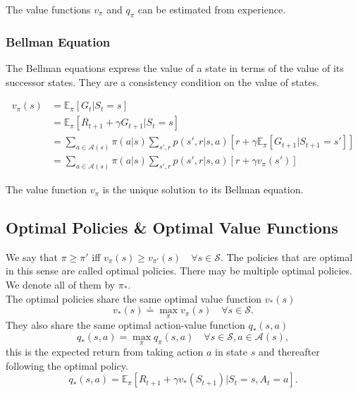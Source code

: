 \documentclass[a4paper, oneside, 11pt]{article}
\newcommand\Epi{\mathbb{E}_\pi}
\begin{document}
The value functions $v_\pi$ and $q_\pi$ can be estimated from experience.\\

\subsubsection*{Bellman Equation}

The Bellman equations express the value of a state in terms of the value of its successor states. They are a consistency condition on the value of states. 

\begin{align}
    v_{\pi}(s) &= \Epi{}[G_t | S_t = s] \\
             &= \Epi{}[R_{t+1} + \gamma G_{t+1} | S_t = s] \\
             &= \sum_{a \in \mathcal{A}(s)} \pi(a|s) \sum_{s', r} p(s', r | s, a) \left[r + \gamma \Epi{}[G_{t+1} | S_{t+1} = s']\right] \\
             &=  \sum_{a \in \mathcal{A}(s)} \pi(a|s) \sum_{s', r} p(s', r | s, a) [r + \gamma v_{\pi}(s')]
\end{align} 
    

The value function $v_\pi$ is the unique solution to its Bellman equation.


\subsection{Optimal Policies \& Optimal Value Functions}
We say that $\pi \geq \pi'$ iff $v_\pi (s) \geq v_{\pi'}(s) \quad \forall s \in \mathcal{S}$. The policies that are optimal in this sense are called optimal policies. There may be multiple optimal policies. We denote all of them by $\pi_*$.\\

The optimal policies share the same optimal value function $v_*(s)$
\begin{equation}
    v_*(s) \doteq \max_\pi v_\pi(s) \quad \forall s \in \mathcal{S}.
\end{equation}
They also share the same optimal action-value function $q_*(s, a)$
\begin{equation}
    q_*(s, a) = \max_\pi q_\pi (s, a) \quad \forall s \in \mathcal{S}, a \in \mathcal{A}(s),
\end{equation}
this is the expected return from taking action $a$ in state $s$ and thereafter following the optimal policy.
\begin{equation}
    q_*(s, a) = \Epi{} [R_{t+1} + \gamma v_*(S_{t+1}) | S_{t} = s, A_t = a].
\end{equation}\\
\end{document}
